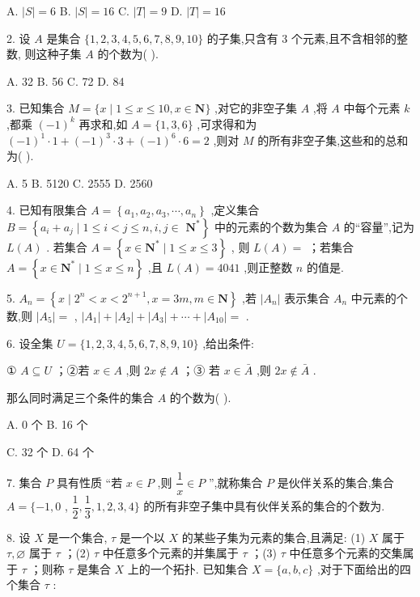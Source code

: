 A. $\left| S\right|  = 6$ B. $\left| S\right|  = {16}$ C. $\left| T\right|  = 9$ D. $\left| T\right|  = {16}$

2. 设 $A$ 是集合 $\{ 1,2,3,4,5,6,7,8,9,{10}\}$ 的子集,只含有 3 个元素,且不含相邻的整数, 则这种子集 $A$ 的个数为(   ).

A. 32 B. 56 C. 72 D. 84

3. 已知集合 $M = \{ x \mid  1 \leq  x \leq  {10},x \in  \mathbf{N}\}$ ,对它的非空子集 $A$ ,将 $A$ 中每个元素 $k$ ,都乘 ${\left( -1\right) }^{k}$ 再求和,如 $A = \{ 1,3,6\}$ ,可求得和为 ${\left( -1\right) }^{1} \cdot  1 + {\left( -1\right) }^{3} \cdot  3 + {\left( -1\right) }^{6} \cdot  6 = 2$ ,则对 $M$ 的所有非空子集,这些和的总和为(   ).

A. 5 B. 5120 C. 2555 D. 2560

4. 已知有限集合 $A = \left\{  {{a}_{1},{a}_{2},{a}_{3},\cdots ,{a}_{n}}\right\}$ ,定义集合 $B = \left\{  {{a}_{i} + {a}_{j} \mid  1 \leq  i < j \leq  n,i,j \in  }\right.$  $\left. {\mathbf{N}}^{ * }\right\}$ 中的元素的个数为集合 $A$ 的“容量”,记为 $L\left( A\right)$ . 若集合 $A = \left\{  {x \in  {\mathbf{N}}^{ * } \mid  1 \leq  x \leq  3}\right\}$ , 则 $L\left( A\right)  =$ \blkda{}；若集合 $A = \left\{  {x \in  {\mathbf{N}}^{ * } \mid  1 \leq  x \leq  n}\right\}$ ,且 $L\left( A\right)  = {4041}$ ,则正整数 $n$ 的值是\blkda{}.

5. ${A}_{n} = \left\{  {x \mid  {2}^{n} < x < {2}^{n + 1},x = {3m},m \in  \mathbf{N}}\right\}$ ,若 $\left| {A}_{n}\right|$ 表示集合 ${A}_{n}$ 中元素的个数,则 $\left| {A}_{5}\right|  =$ \blkda{}, $\left| {A}_{1}\right|  + \left| {A}_{2}\right|  + \left| {A}_{3}\right|  + \cdots  + \left| {A}_{10}\right|  =$ \blkda{}.

6. 设全集 $U = \{ 1,2,3,4,5,6,7,8,9,{10}\}$ ,给出条件:

① $A \subseteq  U$ ；②若 $x \in  A$ ,则 ${2x} \notin  A$ ；③ 若 $x \in  \bar{A}$ ,则 ${2x} \notin  \bar{A}$ .

那么同时满足三个条件的集合 $A$ 的个数为(   ).

A. 0 个 B. 16 个

C. 32 个 D. 64 个

7. 集合 $P$ 具有性质 “若 $x \in  P$ ,则 $\dfrac{1}{x} \in  P$ ”,就称集合 $P$ 是伙伴关系的集合,集合 $A = \{  - 1,0$ , $\dfrac{1}{2},\dfrac{1}{3},1,2,3,4\}$ 的所有非空子集中具有伙伴关系的集合的个数为\blkda{}.

8. 设 $X$ 是一个集合, $\tau$ 是一个以 $X$ 的某些子集为元素的集合,且满足: (1) $X$ 属于 $\tau ,\varnothing$ 属于 $\tau$ ；(2) $\tau$ 中任意多个元素的并集属于 $\tau$ ；(3) $\tau$ 中任意多个元素的交集属于 $\tau$ ；则称 $\tau$ 是集合 $X$ 上的一个拓扑. 已知集合 $X = \{ a,b,c\}$ ,对于下面给出的四个集合 $\tau$ :

